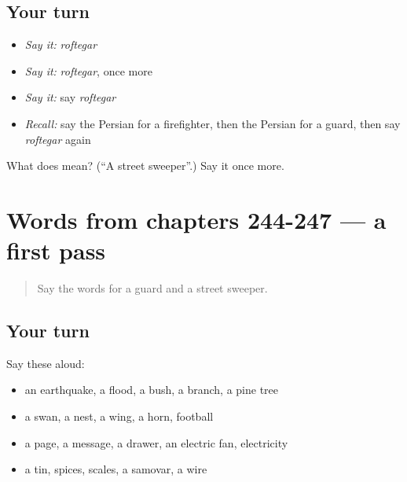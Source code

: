 \subsection*{Your turn}
\begin{itemize}
\raggedright
  \item \emph{Say it:} \emph{roftegar}
  \item \emph{Say it:} \emph{roftegar}, once more
  \item \emph{Say it:} say \emph{roftegar}
  \item \emph{Recall:} say the Persian for a firefighter, then the Persian for a guard, then say \emph{roftegar} again
\end{itemize}

\begin{tcolorbox}[breakable,colback=teal!4,colframe=teal!35!black,title={Before you move on}]
What does  mean? (\textquotedblleft{}A street sweeper\textquotedblright{}.) Say it once more.
\end{tcolorbox}
\section[(dialogue)]{Words from chapters 244-247 — a first pass}

\label{lesson:FA-R252-first-pass-words-from-chapters-244-247}



\begin{quote}
Say the words for a guard and a street sweeper.
\end{quote}

\subsection*{Your turn}
Say these aloud:

\begin{itemize}
\raggedright
  \item an earthquake, a flood, a bush, a branch, a pine tree
  \item a swan, a nest, a wing, a horn, football
  \item a page, a message, a drawer, an electric fan, electricity
  \item a tin, spices, scales, a samovar, a wire
\end{itemize}

